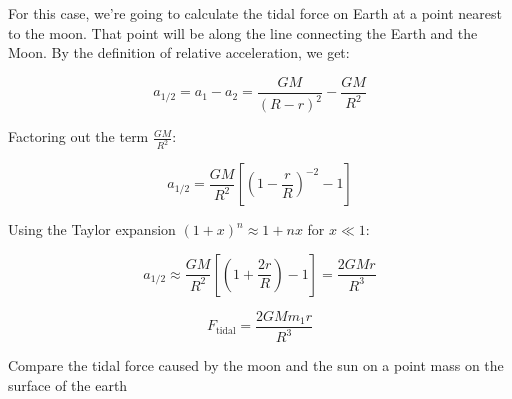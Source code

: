 \documentclass[10pt, a4paper]{article}
\begin{document}
For this case, we're going to calculate the tidal force on Earth at a point nearest to the moon. That point will be along the line connecting the Earth and the Moon. By the definition of relative acceleration, we get:

\begin{equation*}
a_{1/2} = a_1 - a_2 = \frac{GM}{(R-r)^2} - \frac{GM}{R^2} 
\end{equation*}

Factoring out the term $\frac{GM}{R^2}$:

\begin{equation*}
a_{1/2} = \frac{GM}{R^2} \left[ \left( 1 - \frac{r}{R} \right)^{-2} - 1 \right]
\end{equation*}

Using the Taylor expansion $(1+x)^n \approx 1 + nx$ for $x \ll 1$:

\begin{equation*}
a_{1/2} \approx \frac{GM}{R^2} \left[ \left( 1 + \frac{2r}{R} \right) - 1 \right] = \frac{2GMr}{R^3}
\end{equation*}

\bigskip
\[
\boxed{F_{\text{tidal}} = \frac{2GMm_1r}{R^3}}
\]


\begin{tcolorbox}[colback=blue!5!white,colframe=blue!75!black,title=Problem]
Compare the tidal force caused by the moon and the sun on a point mass on the surface of the earth
\end{tcolorbox}
\end{document}
